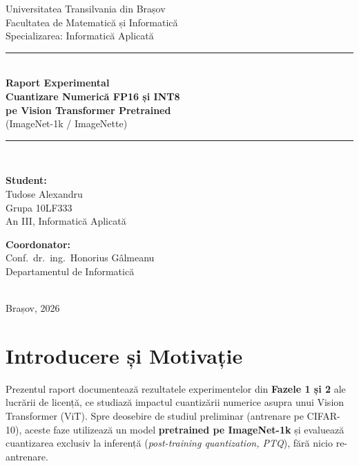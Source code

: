 \documentclass[12pt,a4paper]{article}
\begin{document}

\begin{titlepage}
  \centering
  {\large Universitatea Transilvania din Brașov\\}
  {\small Facultatea de Matematică și Informatică\\}
  {\small Specializarea: Informatică Aplicată\\[2cm]}

  \rule{\linewidth}{0.4pt}\\[0.5cm]
  {\LARGE\bfseries Raport Experimental\\[0.3cm]}
  {\Large\bfseries Cuantizare Numerică FP16 și INT8\\[0.2cm]}
  {\Large\bfseries pe Vision Transformer Pretrained\\[0.2cm]}
  {\large (ImageNet-1k / ImageNette)}\\[0.3cm]
  \rule{\linewidth}{0.4pt}\\[2cm]

  \begin{minipage}{0.45\textwidth}
    \textbf{Student:}\\
    Tudose Alexandru\\
    Grupa 10LF333\\
    An III, Informatică Aplicată
  \end{minipage}
  \hfill
  \begin{minipage}{0.45\textwidth}
    \raggedleft
    \textbf{Coordonator:}\\
    Conf.\ dr.\ ing.\ Honorius Gâlmeanu\\
    Departamentul de Informatică
  \end{minipage}\\[3cm]

  {\small Brașov, 2026}
\end{titlepage}

\tableofcontents
\newpage

\section{Introducere și Motivație}

Prezentul raport documentează rezultatele experimentelor din \textbf{Fazele 1 și 2}
ale lucrării de licență, ce studiază impactul cuantizării numerice asupra unui
Vision Transformer (ViT). Spre deosebire de studiul preliminar (antrenare pe CIFAR-10),
aceste faze utilizează un model \textbf{pretrained pe ImageNet-1k} și evaluează
cuantizarea exclusiv la inferență (\emph{post-training quantization, PTQ}), fără
nicio re-antrenare.
\end{document}
